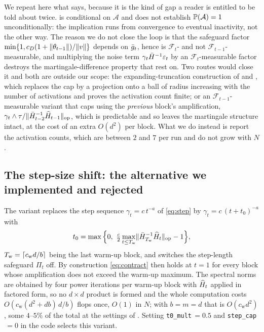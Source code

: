 \noindent
We repeat here what  says, because it is the kind of gap a reader is entitled
to be told about twice.  is conditional on $\mathcal A$ and does not establish
$\mathbb{P}(\mathcal A)=1$ unconditionally: the implication runs from convergence to eventual
inactivity, not the other way. The reason we do not close the loop is that the safeguard factor
$\min\{1,c_D(1+\lVert \theta_{t-1} \rVert)/\lVert v \rVert\}$ depends on $\bar{g}_t$, hence is $\mathcal F_t$- and
not $\mathcal F_{t-1}$-measurable, and multiplying the noise term $\gamma_t\bar{H}^{-1}\varepsilon_t$ by an
$\mathcal F_t$-measurable factor destroys the martingale-difference property that
 rest on. Two routes would close it and both are outside our scope: the
expanding-truncation construction of \citet{kushner2003stochastic} and
\citet{andrieu2005stability}, which replaces the cap by a projection onto a ball of radius
increasing with the number of activations and proves the activation count finite; or an
$\mathcal F_{t-1}$-measurable variant that caps using the \emph{previous} block's amplification,
$\gamma_t\wedge\tau/\lVert \bar{H}_{t-2}^{-1}\widehat H_{t-1} \rVert_{\mathrm{op}}$, which is predictable and so leaves the
martingale structure intact, at the cost of an extra $O(d^2)$ per block. What we do instead is
report the activation counts, which are between $2$ and $7$ per run and do not grow with $N$.

\subsection{The step-size shift: the alternative we implemented and rejected}
\label{app:t0}

The variant replaces the step sequence $\gamma_t=c\,t^{-a}$ of \eqref{eq:step} by
$\gamma_t=c\,(t+t_0)^{-a}$ with
\begin{equation}
t_0=\max\Big\{0,\ \tfrac{c}{2}\max_{t\le \Tw}\opnorm{\Hb_{\Tw}^{-1}\Hh_t}-1\Big\},
\label{eq:t0}
\end{equation}
$T_{\mathrm w}=\lceil c_{\mathrm w}d/b\rceil$ being the last warm-up block, and switches the step-length
safeguard $\Pi_t$ off. By construction \eqref{eq:contract} then holds at $t=1$ for every block
whose amplification does not exceed the warm-up maximum. The spectral norms are obtained by four
power iterations per warm-up block with $\widehat H_t$ applied in factored form, so no $d\times d$
product is formed and the whole computation costs
$O(c_{\mathrm w}(d^2+db)\,d/b)$ flops once, $O(1)$ in $N$; with $b=m=d$ that is
$O(c_{\mathrm w}d^2)$, some $4$--$5\%$ of the total at the settings of . Setting
\texttt{t0\_mult}$\,=0.5$ and \texttt{step\_cap}$\,=0$ in the code selects this variant.

